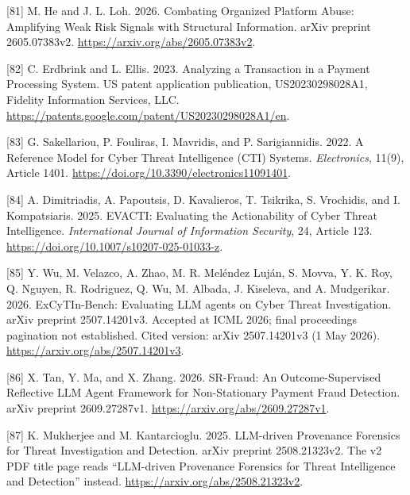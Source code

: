 \documentclass[
  11pt,
]{article}
\newlength{\cslhangindent}
\newlength{\cslentryspacingunit} %
\newenvironment{CSLReferences}[2] %
 {%
  \setlength{\parindent}{0pt}
  \ifodd #1
  \let\oldpar\par
  \def\par{\hangindent=\cslhangindent\oldpar}
  \fi
  \setlength{\parskip}{#2\cslentryspacingunit}
 }%
 {}
\begin{document}
\begin{CSLReferences}{1}{1}
\leavevmode{}%
{[}81{]} M. He and J. L. Loh. 2026. Combating Organized Platform Abuse:
Amplifying Weak Risk Signals with Structural Information. arXiv preprint
2605.07383v2. \url{https://arxiv.org/abs/2605.07383v2}.

\leavevmode{}%
{[}82{]} C. Erdbrink and L. Ellis. 2023. Analyzing a Transaction in a
Payment Processing System. US patent application publication,
US20230298028A1, Fidelity Information Services, LLC.
\url{https://patents.google.com/patent/US20230298028A1/en}.

\leavevmode{}%
{[}83{]} G. Sakellariou, P. Fouliras, I. Mavridis, and P. Sarigiannidis.
2022. A Reference Model for Cyber Threat Intelligence (CTI) Systems.
\emph{Electronics}, 11(9), Article 1401.
\url{https://doi.org/10.3390/electronics11091401}.

\leavevmode{}%
{[}84{]} A. Dimitriadis, A. Papoutsis, D. Kavalieros, T. Tsikrika, S.
Vrochidis, and I. Kompatsiaris. 2025. EVACTI: Evaluating the
Actionability of Cyber Threat Intelligence. \emph{International Journal
of Information Security}, 24, Article 123.
\url{https://doi.org/10.1007/s10207-025-01033-z}.

\leavevmode{}%
{[}85{]} Y. Wu, M. Velazco, A. Zhao, M. R. Meléndez Luján, S. Movva, Y.
K. Roy, Q. Nguyen, R. Rodriguez, Q. Wu, M. Albada, J. Kiseleva, and A.
Mudgerikar. 2026. ExCyTIn-Bench: Evaluating LLM agents on Cyber Threat
Investigation. arXiv preprint 2507.14201v3. Accepted at ICML 2026; final
proceedings pagination not established. Cited version: arXiv
2507.14201v3 (1 May 2026). \url{https://arxiv.org/abs/2507.14201v3}.

\leavevmode{}%
{[}86{]} X. Tan, Y. Ma, and X. Zhang. 2026. SR-Fraud: An
Outcome-Supervised Reflective LLM Agent Framework for Non-Stationary
Payment Fraud Detection. arXiv preprint 2609.27287v1.
\url{https://arxiv.org/abs/2609.27287v1}.

\leavevmode{}%
{[}87{]} K. Mukherjee and M. Kantarcioglu. 2025. LLM-driven Provenance
Forensics for Threat Investigation and Detection. arXiv preprint
2508.21323v2. The v2 PDF title page reads ``LLM-driven Provenance
Forensics for Threat Intelligence and Detection'' instead.
\url{https://arxiv.org/abs/2508.21323v2}.


\end{CSLReferences}
\end{document}
